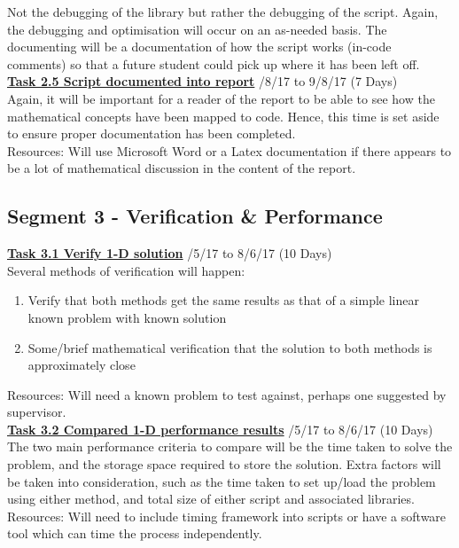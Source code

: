 \documentclass[11pt,draftd]{article}
\begin{document}
\begin{appendices}
	Not the debugging of the library but rather the debugging of the script. Again, the debugging and optimisation will occur on an as-needed basis. The documenting will be a documentation of how the script works (in-code comments) so that a future student could pick up where it has been left off.\\
	
	\noindent\underline{\textbf{Task 2.5 Script documented into report}} /8/17 to 9/8/17 (7 Days) \\
	
	Again, it will be important for a reader of the report to be able to see how the mathematical concepts have been mapped to code. Hence, this time is set aside to ensure proper documentation has been completed. \\
	Resources: Will use Microsoft Word or a Latex documentation if there appears to be a lot of mathematical discussion in the content of the report.
	
	
	\subsection{Segment 3 - Verification \& Performance}
	\underline{\textbf{Task 3.1 Verify 1-D solution}} /5/17 to 8/6/17 (10 Days) \\
	
	Several methods of verification will happen:
	\begin{enumerate}
		\item Verify that both methods get the same results as that of a simple linear known problem with known solution
		\item Some/brief mathematical verification that the solution to both methods is approximately close
	\end{enumerate}
	Resources: Will need a known problem to test against, perhaps one suggested by supervisor.\\
	
	\noindent\underline{\textbf{Task 3.2 Compared 1-D performance results}} /5/17 to 8/6/17 (10 Days) \\
	
	The two main performance criteria to compare will be the time taken to solve the problem, and the storage space required to store the solution. Extra factors will be taken into consideration, such as the time taken to set up/load the problem using either method, and total size of either script and associated libraries. \\
	Resources: Will need to include timing framework into scripts or have a software tool which can time the process independently.\\
	

\end{appendices}
\end{document}

